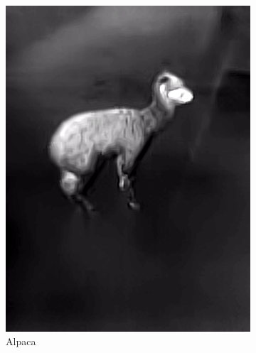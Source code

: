 \documentclass{l4proj}
\begin{document}
\begin{figure}[ht]
\begin{subfigure}[h!]{0.18\textwidth}
    \includegraphics[width=\textwidth, trim={0cm 2.5cm 0cm 2.5cm}, clip]{images/dataset/alpaca/lwir.png}
    \caption{Alpaca}
  \end{subfigure}
  \begin{subfigure}[h!]{0.18\textwidth}

\end{subfigure}
\end{figure}
\end{document}
